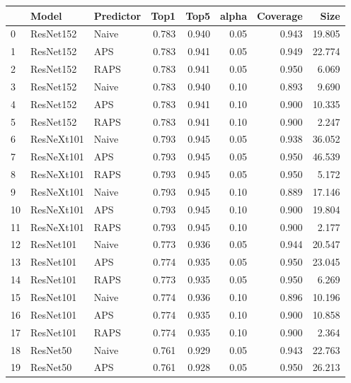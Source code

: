 \begin{tabular}{lllrrrrr}
\toprule
{} &        Model & Predictor &   Top1 &   Top5 &  alpha &  Coverage &    Size \\
\midrule
0  &    ResNet152 &     Naive &  0.783 &  0.940 &   0.05 &     0.943 &  19.805 \\
1  &    ResNet152 &       APS &  0.783 &  0.941 &   0.05 &     0.949 &  22.774 \\
2  &    ResNet152 &      RAPS &  0.783 &  0.941 &   0.05 &     0.950 &   6.069 \\
3  &    ResNet152 &     Naive &  0.783 &  0.940 &   0.10 &     0.893 &   9.690 \\
4  &    ResNet152 &       APS &  0.783 &  0.941 &   0.10 &     0.900 &  10.335 \\
5  &    ResNet152 &      RAPS &  0.783 &  0.941 &   0.10 &     0.900 &   2.247 \\
6  &   ResNeXt101 &     Naive &  0.793 &  0.945 &   0.05 &     0.938 &  36.052 \\
7  &   ResNeXt101 &       APS &  0.793 &  0.945 &   0.05 &     0.950 &  46.539 \\
8  &   ResNeXt101 &      RAPS &  0.793 &  0.945 &   0.05 &     0.950 &   5.172 \\
9  &   ResNeXt101 &     Naive &  0.793 &  0.945 &   0.10 &     0.889 &  17.146 \\
10 &   ResNeXt101 &       APS &  0.793 &  0.945 &   0.10 &     0.900 &  19.804 \\
11 &   ResNeXt101 &      RAPS &  0.793 &  0.945 &   0.10 &     0.900 &   2.177 \\
12 &    ResNet101 &     Naive &  0.773 &  0.936 &   0.05 &     0.944 &  20.547 \\
13 &    ResNet101 &       APS &  0.774 &  0.935 &   0.05 &     0.950 &  23.045 \\
14 &    ResNet101 &      RAPS &  0.773 &  0.935 &   0.05 &     0.950 &   6.269 \\
15 &    ResNet101 &     Naive &  0.774 &  0.936 &   0.10 &     0.896 &  10.196 \\
16 &    ResNet101 &       APS &  0.774 &  0.935 &   0.10 &     0.900 &  10.858 \\
17 &    ResNet101 &      RAPS &  0.774 &  0.935 &   0.10 &     0.900 &   2.364 \\
18 &     ResNet50 &     Naive &  0.761 &  0.929 &   0.05 &     0.943 &  22.763 \\
19 &     ResNet50 &       APS &  0.761 &  0.928 &   0.05 &     0.950 &  26.213 \\

\end{tabular}
